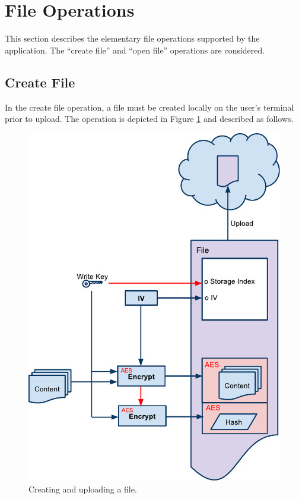 \documentclass[pdftex,english,10pt,b5paper,twoside]{book}
\begin{document}
\section{File Operations}
This section describes the elementary file operations supported by the 
application. The ``create file'' and ``open file'' operations are considered.

\subsection{Create File}
In the create file operation, a file must be created locally on the user's terminal
prior to upload. The operation is depicted in Figure \ref{fig:CS:CF} and
described as follows.

\begin{figure}[h!]
    \centering
    \includegraphics[width=\columnwidth]{CryptoCreateFile.pdf}
    \caption{Creating and uploading a file. }
    \label{fig:CS:CF}
\end{figure}
\end{document}
